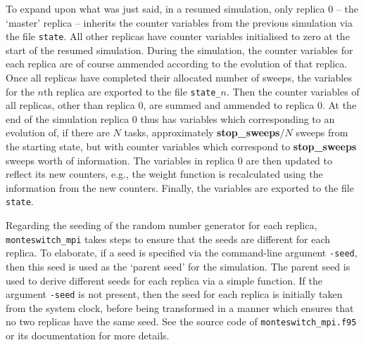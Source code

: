 \documentclass{report}
\begin{document}
To expand upon what was just said, in a resumed simulation, only replica 0 -- the `master' replica -- inherits the counter variables from the previous 
simulation via the file \texttt{state}. All other replicas have counter variables initialised to zero at the start of the resumed simulation.
During the simulation, the counter variables for each replica are of course ammended according to the evolution of that replica. Once all replicas have
completed their allocated number of sweeps, the variables for the $n$th replica are exported to the file \texttt{state\_}$n$. Then 
the counter variables of all replicas, other than replica 0, are summed and ammended to replica 0. At the end of the simulation replica 0 thus has
variables which corresponding to an evolution of, if there are $N$ tasks, approximately \textbf{stop\_sweeps}$/N$ sweeps from the starting state, 
but with counter variables which correspond to \textbf{stop\_sweeps} sweeps worth of information. The variables in replica 0 are then updated to reflect 
its new counters, e.g., the weight function is recalculated using the information from the new counters. Finally, the variables are
exported to the file \texttt{state}.

Regarding the seeding of the random number generator for each replica, \texttt{monteswitch\_mpi} takes steps to ensure that the seeds are
different for each replica. To elaborate, if a seed is specified via the command-line argument \texttt{-seed}, then this seed is
used as the `parent seed' for the simulation. The parent seed is used to derive different seeds for each replica via a simple function. If the
argument \texttt{-seed} is not present, then the seed for each replica is initially taken from the system clock, before being transformed
in a manner which ensures that no two replicas have the same seed. See the source code of \texttt{monteswitch\_mpi.f95} or its documentation
for more details.



\end{document}
